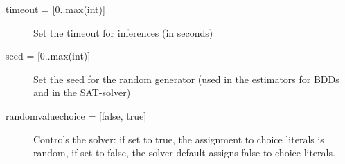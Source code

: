 \begin{description}
	\item[{timeout = [0..max(int)]}] Set the timeout for inferences (in seconds)
	\item[{seed = [0..max(int)]}] Set the seed for the random generator (used in the estimators for BDDs and in the SAT-solver)
	\item[{randomvaluechoice = [false, true]}] Controls the solver: if set to true, the assignment to choice literals is random, if set to false, the solver default assigns false to choice literals.
\end{description}